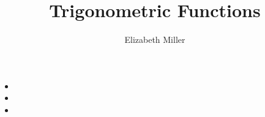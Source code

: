 \documentclass{ximera}
\author{Elizabeth Miller}
\title{Trigonometric Functions}
\begin{document}
\begin{abstract}
\end{abstract}
\maketitle


\begin{objectives}

\item 
\begin{itemize}
	\item 
	\item 
	\item 
\end{itemize}




\end{objectives}
\end{document}
